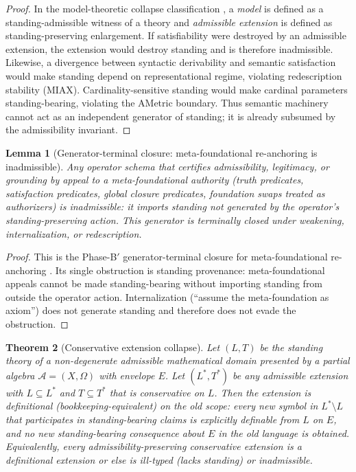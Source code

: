 \documentclass[11pt]{article}
\newtheorem{theorem}{Theorem}[section]
\newtheorem{lemma}[theorem]{Lemma}
\theoremstyle{definition}
\begin{document}
\begin{proof}
In the model-theoretic collapse classification \cite{MaleyModelTheoreticCollapse2026}, a \emph{model} is defined as a standing-admissible witness of a theory and \emph{admissible extension} is defined as standing-preserving enlargement.
If satisfiability were destroyed by an admissible extension, the extension would destroy standing and is therefore inadmissible.
Likewise, a divergence between syntactic derivability and semantic satisfaction would make standing depend on representational regime, violating redescription stability (MIAX).
Cardinality-sensitive standing would make cardinal parameters standing-bearing, violating the AMetric boundary.
Thus semantic machinery cannot act as an independent generator of standing; it is already subsumed by the admissibility invariant.
\end{proof}

\begin{lemma}[Generator-terminal closure: meta-foundational re-anchoring is inadmissible]
\label{lem:no-meta-reanchor}
Any operator schema that certifies admissibility, legitimacy, or grounding by appeal to a meta-foundational authority (truth predicates, satisfaction predicates, global closure predicates, foundation swaps treated as authorizers) is inadmissible: it imports standing not generated by the operator's standing-preserving action.
This generator is terminally closed under weakening, internalization, or redescription.
\end{lemma}

\begin{proof}
This is the Phase-B$'$ generator-terminal closure for meta-foundational re-anchoring \cite{MaleyMetaReAnchorTerminal2026}.
Its single obstruction is standing provenance: meta-foundational appeals cannot be made standing-bearing without importing standing from outside the operator action.
Internalization (``assume the meta-foundation as axiom'') does not generate standing and therefore does not evade the obstruction.
\end{proof}

\begin{theorem}[Conservative extension collapse]
\label{thm:conservative-collapse}
Let $(L,T)$ be the standing theory of a non-degenerate admissible mathematical domain presented by a partial algebra $\mathcal{A}=(X,\Omega)$ with envelope $E$.
Let $(L^*,T^*)$ be any admissible extension with $L\subseteq L^*$ and $T\subseteq T^*$ that is conservative on $L$.
Then the extension is definitional (bookkeeping-equivalent) on the old scope:
every new symbol in $L^*\setminus L$ that participates in standing-bearing claims is explicitly definable from $L$ on $E$, and no new standing-bearing consequence about $E$ in the old language is obtained.
Equivalently, every admissibility-preserving conservative extension is a definitional extension or else is ill-typed (lacks standing) or inadmissible.
\end{theorem}
\end{document}
